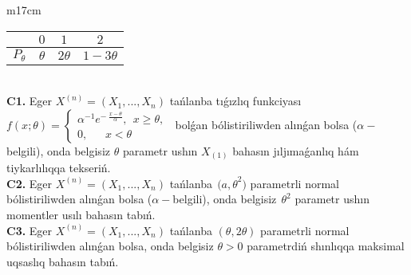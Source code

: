 \documentclass{article}
\begin{document}
\begin{tabular}{m{17cm}}
\begin{tabular}{|c|c|c|c|}
&
$0$
&
$1$
&
$2$\\
\hline
\(P_{\theta}\) & \(\theta\) & \(2\theta\) & \(1 - 3\theta\) \\
\hline
\end{tabular}
 \\
\textbf{C1.} 
Eger \(X^{(n)} = \left( X_{1},...,X_{n} \right)\) tańlanba tıǵızlıq funkciyası
$f(x;\theta) = \left\{ \begin{array}{r}
\alpha^{- 1}e^{- \ \frac{x - \theta}{\alpha}},\ \ x \geq \theta, \\
0,\ \ \ \ \ \ \ x < \theta
\end{array} \right.\ $
bolǵan bólistiriliwden alınǵan bolsa (\(\alpha -\)belgili), onda belgisiz \(\theta\) parametr ushın \(X_{(1)}\) bahasın jıljımaǵanlıq hám tiykarlılıqqa tekseriń.
 \\
\textbf{C2.} 
Eger \(X^{(n)} = \left( X_{1},...,X_{n} \right)\) tańlanba\({\ \ (a,\theta}^{2})\) parametrli normal bólistiriliwden alınǵan bolsa (\(\alpha -\)belgili), onda belgisiz\({\ \ \theta}^{2}\) parametr ushın momentler usılı bahasın tabıń.
 \\
\textbf{C3.} 
Eger \(X^{(n)} = \left( X_{1},...,X_{n} \right)\) tańlanba \((\theta,2\theta)\) parametrli normal bólistiriliwden alınǵan bolsa, onda belgisiz \(\theta > 0\) parametrdiń shınlıqqa maksimal uqsaslıq bahasın tabıń.
 \\

\end{tabular}
\vspace{1cm}
\end{document}
